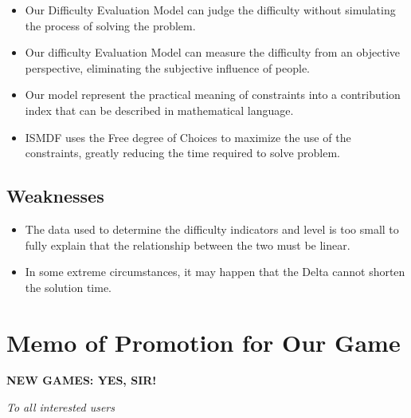\documentclass{mcmthesis}
\begin{document}
			\begin{itemize}
				
				\item Our Difficulty Evaluation Model can judge the difficulty without simulating the process of solving the problem. \\
				\item Our difficulty Evaluation Model can measure the difficulty from an objective perspective, eliminating the subjective influence of people. \\
				\item Our model represent the practical meaning of constraints into a contribution index that can be described in mathematical language. \\
				\item ISMDF uses the Free degree of Choices to maximize the use of the constraints, greatly reducing the time required to solve problem. \\
		
			\end{itemize}
		
		\subsection{Weaknesses}
		
			\begin{itemize}
				
				\item The data used to determine the difficulty indicators and level is too small to fully explain that the relationship between the two must be linear. \\
				\item In some extreme circumstances, it may happen that the Delta cannot shorten the solution time. \\
				
			\end{itemize}
		
	\nocite{*}
	
		
	\clearpage
	\section{Memo of Promotion for Our Game}
	
		\begin{center}
			\Large\textbf{NEW GAMES: YES, SIR!}
			
			\emph{To all interested users}
		\end{center}
		
\end{document}
